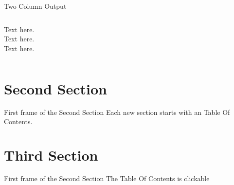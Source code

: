 

\begin{frame}{Two Column Output}
  \begin{columns}[c]
    \column{1.5in}
      Text here.\\
      Text here.\\
      Text here.
    \column{1.5in}
  \end{columns}
\end{frame}



%


\section{Second Section}

\begin{frame}{First frame of the Second Section}
Each new section starts with an Table Of Contents.
\end{frame}

\section{Third Section}
\begin{frame}{First frame of the Second Section}
The Table Of Contents is clickable
\end{frame}
